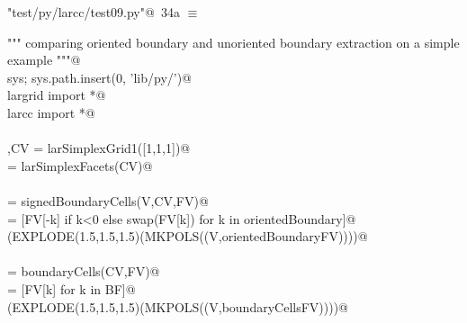 \documentclass[11pt,oneside]{article}	%
\begin{document}
\begin{flushleft} \small \label{scrap58}
\protect{}\verb@"test/py/larcc/test09.py"@\nobreak\ {\footnotesize 34a }$\equiv$
\vspace{-1ex}
\begin{list}{}{} \item
\mbox{}\verb@""" comparing oriented boundary and unoriented boundary extraction on a simple example """@\\
\mbox{}\verb@import sys; sys.path.insert(0, 'lib/py/')@\\
\mbox{}\verb@from largrid import *@\\
\mbox{}\verb@from larcc import *@\\
\mbox{}\verb@@\\
\mbox{}\verb@V,CV = larSimplexGrid1([1,1,1])@\\
\mbox{}\verb@FV = larSimplexFacets(CV)@\\
\mbox{}\verb@@\\
\mbox{}\verb@orientedBoundary = signedBoundaryCells(V,CV,FV)@\\
\mbox{}\verb@orientedBoundaryFV = [FV[-k] if k<0 else swap(FV[k]) for k in orientedBoundary]@\\
\mbox{}\verb@VIEW(EXPLODE(1.5,1.5,1.5)(MKPOLS((V,orientedBoundaryFV))))@\\
\mbox{}\verb@@\\
\mbox{}\verb@BF = boundaryCells(CV,FV)@\\
\mbox{}\verb@boundaryCellsFV = [FV[k] for k in BF]@\\
\mbox{}\verb@VIEW(EXPLODE(1.5,1.5,1.5)(MKPOLS((V,boundaryCellsFV))))@\\
\mbox{}\verb@@{\NWsep}
\end{list}
\vspace{-2ex}
\end{flushleft}
\end{document}
